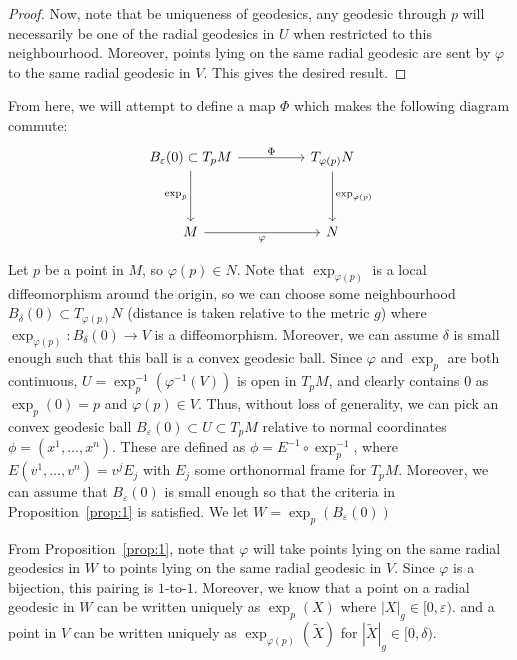 \documentclass[aps,pra,showpacs,notitlepage,onecolumn,superscriptaddress,nofootinbib]{revtex4-1}
\theoremstyle{definition}
\begin{document}
\begin{proof}
  \noindent Now, note that be uniqueness of geodesics, any geodesic through $p$ will necessarily be one of the radial geodesics in $U$ when restricted to this neighbourhood.
  Moreover, points lying on the same radial geodesic are sent by $\varphi$ to the same radial geodesic in $V$. This gives the desired result.
\end{proof}

\noindent From here, we will attempt to define a map $\Phi$ which makes the following diagram commute:
\[\begin{tikzcd}
	          {B_{\varepsilon}(0) \subset T_p M} && {T_{\varphi(p)} N} \\
	          \\
	          M && {N}
	          \arrow["\Phi", from=1-1, to=1-3]
	          \arrow["{\exp_p}"', from=1-1, to=3-1]
	          \arrow["{\exp_{\varphi(p)}}", from=1-3, to=3-3]
	          \arrow["\varphi"', from=3-1, to=3-3]
\end{tikzcd}\]

\noindent Let $p$ be a point in $M$, so $\varphi(p) \in N$. Note that $\exp_{\varphi(p)}$ is a local diffeomorphism around the origin, so we can choose some neighbourhood $B_{\delta}(0) \subset T_{\varphi(p)} N$ (distance is taken relative to the metric $g$)
where $\exp_{\varphi(p)} : B_{\delta}(0) \rightarrow V$
is a diffeomorphism. Moreover, we can assume $\delta$ is small enough such that this ball is a convex geodesic ball.
Since $\varphi$ and $\exp_p$ are both continuous, $U = \exp_p^{-1}(\varphi^{-1}(V))$ is open in $T_p M$, and clearly contains $0$ as $\exp_p(0) = p$ and $\varphi(p) \in V$. Thus, without loss of generality,
we can pick an convex geodesic ball $B_{\varepsilon}(0) \subset U \subset T_p M$ relative to normal coordinates $\phi = (x^1, \dots, x^n)$. These are defined as $\phi = E^{-1} \circ \exp_p^{-1}$,
where $E(v^1, \dots, v^n) = v^j E_j$ with $E_j$ some orthonormal frame for $T_p M$. Moreover, we can assume that $B_{\varepsilon}(0)$ is small enough so that the criteria in Proposition~\ref{prop:1} is satisfied.
We let $W = \exp_p(B_{\varepsilon}(0))$
\newline

\noindent From Proposition~\ref{prop:1}, note that $\varphi$ will take points lying on the same radial geodesics in $W$ to points lying on the same radial geodesic in $V$. Since $\varphi$ is a bijection, this
pairing is $1$-to-$1$. Moreover, we know that a point on a radial geodesic in $W$ can be written uniquely as $\exp_p(X)$ where $|X|_g \in [0, \varepsilon)$. and a point in $V$
  can be written uniquely as $\exp_{\varphi(p)}(\widetilde{X})$ for $|\widetilde{X}|_g \in [0, \delta)$.
\end{document}
